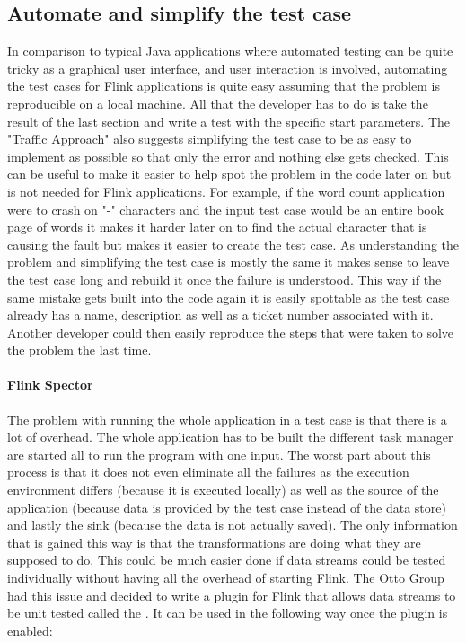 \subsection{Automate and simplify the test case}
In comparison to typical Java applications where automated testing can be quite tricky as a graphical user interface, and user interaction is involved, automating the test cases for Flink applications is quite easy assuming that the problem is reproducible on a local machine. All that the developer has to do is take the result of the last section and write a test with the specific start parameters. The "Traffic Approach" also suggests simplifying the test case to be as easy to implement as possible so that only the error and nothing else gets checked. This can be useful to make it easier to help spot the problem in the code later on but is not needed for Flink applications. For example, if the word count application were to crash on "-" characters and the input test case would be an entire book page of words it makes it harder later on to find the actual character that is causing the fault but makes it easier to create the test case. As understanding the problem and simplifying the test case is mostly the same it makes sense to leave the test case long and rebuild it once the failure is understood. This way if the same mistake gets built into the code again it is easily spottable as the test case already has a name, description as well as a ticket number associated with it. Another developer could then easily reproduce the steps that were taken to solve the problem the last time.

\paragraph{Flink Spector} The problem with running the whole application in a test case is that there is a lot of overhead. The whole application has to be built the different task manager are started all to run the program with one input. The worst part about this process is that it does not even eliminate all the failures as the execution environment differs (because it is executed locally) as well as the source of the application (because data is provided by the test case instead of the data store) and lastly the sink (because the data is not actually saved). The only information that is gained this way is that the transformations are doing what they are supposed to do. This could be much easier done if data streams could be tested individually without having all the overhead of starting Flink. The Otto Group had this issue and decided to write a plugin for Flink that allows data streams to be unit tested called the \cite{FlinkSpector}. It can be used in the following way once the plugin is enabled:


